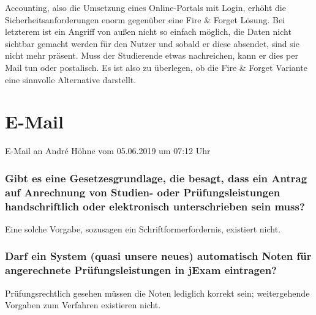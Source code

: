 \documentclass[ngerman]{tudscrreprt}
\begin{document}
Accounting, also die Umsetzung eines Online-Portals mit Login, erhöht die Sicherheitsanforderungen enorm gegenüber eine Fire \& Forget Lösung. Bei letzterem ist ein Angriff von außen nicht so einfach möglich, die Daten nicht sichtbar gemacht werden für den Nutzer und sobald er diese absendet, sind sie nicht mehr präsent. Muss der Studierende etwas nachreichen, kann er dies per Mail tun oder postalisch. Es ist also zu überlegen, ob die Fire \& Forget Variante eine sinnvolle Alternative darstellt.

\chapter{E-Mail}

E-Mail an André Höhne vom 05.06.2019 um 07:12 Uhr

\subsection{Gibt es eine Gesetzesgrundlage, die besagt, dass ein Antrag auf Anrechnung von Studien- oder Prüfungsleistungen handschriftlich oder elektronisch unterschrieben sein muss?}

Eine solche Vorgabe, sozusagen ein Schriftformerfordernis, existiert nicht.

\subsection{Darf ein System (quasi unsere neues) automatisch Noten für angerechnete Prüfungsleistungen in jExam eintragen?}

Prüfungsrechtlich gesehen müssen die Noten lediglich korrekt sein; weitergehende Vorgaben zum Verfahren existieren nicht.
\end{document}
